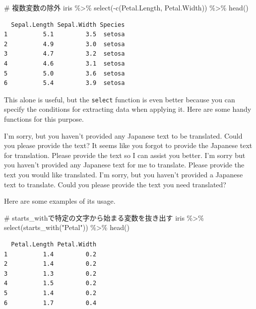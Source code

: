 \documentclass[
  a4paper,
]{book}
\newenvironment{Shaded}{\begin{snugshade}}{\end{snugshade}}
\newcommand{\CommentTok}[1]{\textcolor[rgb]{0.37,0.37,0.37}{#1}}
\newcommand{\FunctionTok}[1]{\textcolor[rgb]{0.28,0.35,0.67}{#1}}
\newcommand{\NormalTok}[1]{\textcolor[rgb]{0.00,0.23,0.31}{#1}}
\newcommand{\SpecialCharTok}[1]{\textcolor[rgb]{0.37,0.37,0.37}{#1}}
\newcommand{\StringTok}[1]{\textcolor[rgb]{0.13,0.47,0.30}{#1}}
\begin{document}
\begin{Shaded}
\begin{Highlighting}[]
\CommentTok{\# 複数変数の除外}
\NormalTok{iris }\SpecialCharTok{\%\textgreater{}\%}
  \FunctionTok{select}\NormalTok{(}\SpecialCharTok{{-}}\FunctionTok{c}\NormalTok{(Petal.Length, Petal.Width)) }\SpecialCharTok{\%\textgreater{}\%}
  \FunctionTok{head}\NormalTok{()}
\end{Highlighting}
\end{Shaded}

\begin{verbatim}
  Sepal.Length Sepal.Width Species
1          5.1         3.5  setosa
2          4.9         3.0  setosa
3          4.7         3.2  setosa
4          4.6         3.1  setosa
5          5.0         3.6  setosa
6          5.4         3.9  setosa
\end{verbatim}

This alone is useful, but the \texttt{select} function is even better
because you can specify the conditions for extracting data when applying
it. Here are some handy functions for this purpose.

I'm sorry, but you haven't provided any Japanese text to be translated.
Could you please provide the text? It seems like you forgot to provide
the Japanese text for translation. Please provide the text so I can
assist you better. I'm sorry but you haven't provided any Japanese text
for me to translate. Please provide the text you would like translated.
I'm sorry, but you haven't provided a Japanese text to translate. Could
you please provide the text you need translated?

Here are some examples of its usage.

\begin{Shaded}
\begin{Highlighting}[]
\CommentTok{\# starts\_withで特定の文字から始まる変数を抜き出す}
\NormalTok{iris }\SpecialCharTok{\%\textgreater{}\%}
  \FunctionTok{select}\NormalTok{(}\FunctionTok{starts\_with}\NormalTok{(}\StringTok{"Petal"}\NormalTok{)) }\SpecialCharTok{\%\textgreater{}\%}
  \FunctionTok{head}\NormalTok{()}
\end{Highlighting}
\end{Shaded}

\begin{verbatim}
  Petal.Length Petal.Width
1          1.4         0.2
2          1.4         0.2
3          1.3         0.2
4          1.5         0.2
5          1.4         0.2
6          1.7         0.4
\end{verbatim}
\end{document}

